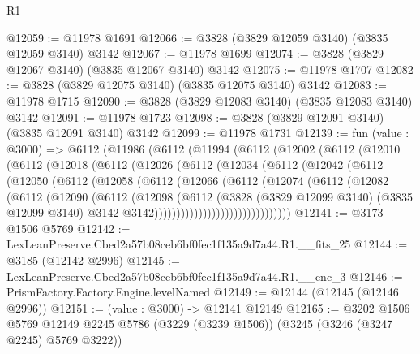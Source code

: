\begin{lexlean}{R1}
\begin{coremodule}
@12059 := @11978 @1691
@12066 := @3828 (@3829 @12059 @3140) (@3835 @12059 @3140) @3142
@12067 := @11978 @1699
@12074 := @3828 (@3829 @12067 @3140) (@3835 @12067 @3140) @3142
@12075 := @11978 @1707
@12082 := @3828 (@3829 @12075 @3140) (@3835 @12075 @3140) @3142
@12083 := @11978 @1715
@12090 := @3828 (@3829 @12083 @3140) (@3835 @12083 @3140) @3142
@12091 := @11978 @1723
@12098 := @3828 (@3829 @12091 @3140) (@3835 @12091 @3140) @3142
@12099 := @11978 @1731
@12139 := fun (value : @3000) =>
  @6112
    (@11986
      (@6112
        (@11994
          (@6112
            (@12002
              (@6112
                (@12010
                  (@6112
                    (@12018
                      (@6112
                        (@12026
                          (@6112
                            (@12034
                              (@6112
                                (@12042
                                  (@6112
                                    (@12050
                                      (@6112
                                        (@12058
                                          (@6112
                                            (@12066
                                              (@6112
                                                (@12074
                                                  (@6112
                                                    (@12082
                                                      (@6112
                                                        (@12090
                                                          (@6112
                                                            (@12098
                                                              (@6112
                                                                (@3828
                                                                  (@3829 @12099 @3140)
                                                                  (@3835 @12099 @3140)
                                                                  @3142
                                                                  @3142)))))))))))))))))))))))))))))))
@12141 := @3173 @1506 @5769
@12142 := LexLeanPreserve.Cbed2a57b08ceb6bf0fec1f135a9d7a44.R1.__fits_25
@12144 := @3185 (@12142 @2996)
@12145 := LexLeanPreserve.Cbed2a57b08ceb6bf0fec1f135a9d7a44.R1.__enc_3
@12146 := PrismFactory.Factory.Engine.levelNamed
@12149 := @12144 (@12145 (@12146 @2996))
@12151 := (value : @3000) -> @12141 @12149
@12165 := @3202
    @1506
    @5769
    @12149
    @2245
    @5786
    (@3229 (@3239 @1506))
    (@3245 (@3246 (@3247 @2245) @5769 @3222))

\end{coremodule}
\end{lexlean}

